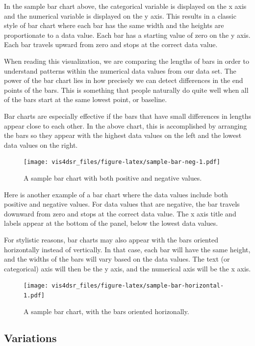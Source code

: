 \documentclass[
]{krantz}
\begin{document}
In the sample bar chart above, the categorical variable is displayed on the
x axis and the numerical variable is displayed on the y axis. This results in a
classic style of bar chart where each bar has the same width and the heights are
proportionate to a data value. Each bar has a starting value of zero on the y axis.
Each bar travels upward from zero and stops at the correct data value.

When reading this visualization, we are comparing the lengths of bars in order to
understand patterns within the numerical data values from our data set. The power
of the bar chart lies in how precisely we can detect differences in the
end points of the bars. This is something that people naturally do quite well
when all of the bars start at the same lowest point, or baseline.

Bar charts are especially effective if the bars that have small differences in
lengths appear close to each other. In the above chart, this is accomplished by
arranging the bars so they appear with the highest data values on the left and
the lowest data values on the right.

\begin{figure}
\centering
\texttt{[image: vis4dsr\_files/figure-latex/sample-bar-neg-1.pdf]}
\caption{\label{fig:sample-bar-neg}A sample bar chart with both positive and negative values.}
\end{figure}

Here is another example of a bar chart where the data values include both positive
and negative values. For data values that are negative, the bar travels downward
from zero and stops at the correct data value. The x axis title and labels appear
at the bottom of the panel, below the lowest data values.

For stylistic reasons, bar charts may also appear with the bars oriented horizontally
instead of vertically. In that case, each bar will have the same height, and the widths
of the bars will vary based on the data values. The text (or categorical) axis will then
be the y axis, and the numerical axis will be the x axis.

\begin{figure}
\centering
\texttt{[image: vis4dsr\_files/figure-latex/sample-bar-horizontal-1.pdf]}
\caption{\label{fig:sample-bar-horizontal}A sample bar chart, with the bars oriented horizonally.}
\end{figure}

\hypertarget{variations}{%
\subsection{Variations}\label{variations}}
\end{document}
